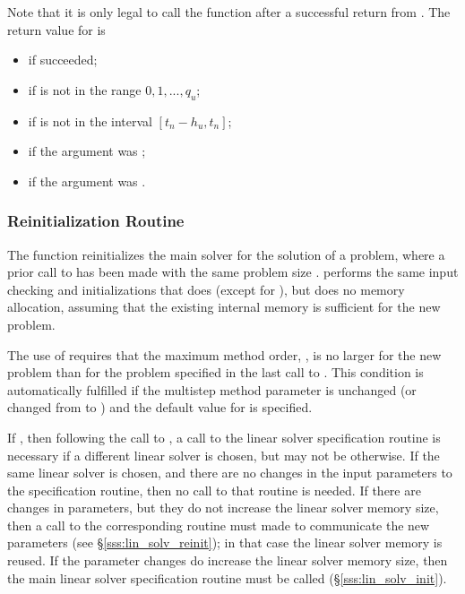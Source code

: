 Note that it is only legal to call the function  after a 
successful return from .
The return value  for  is
\begin{itemize}
\item {} if  succeeded;
\item {} if  is not in the range $0, 1, ..., q_u$;
\item {} if  is not in the interval $[t_n - h_u , t_n]$;
\item {} if the  argument was ;
\item {} if the  argument was .
\end{itemize}

\subsubsection{{\cvode} Reinitialization Routine}\label{sss:cvreinit}

The function  reinitializes the main {\cvode} solver for
the solution of a problem, where a prior call to  has
been made with the same problem size .  performs the 
same input checking and initializations that  does 
(except for ), but does no memory allocation, assuming that the 
existing internal memory is sufficient for the new problem.             
                                                                 
The use of  requires that the maximum method order,    
, is no larger for the new problem than for the problem  
specified in the last call to .  This condition is  
automatically fulfilled if the multistep method parameter   
is unchanged (or changed from  to ) and the default    
value for  is specified.                                 
                                                                 
If , then following the call to , a call  
to the linear solver specification routine is necessary if a   
different linear solver is chosen, but may not be otherwise.   
If the same linear solver is chosen, and there are no changes  
in the input parameters to the specification routine, then no  
call to that routine is needed.                                
If there are changes in parameters, but they do not increase   
the linear solver memory size, then a call to the corresponding
 routine must made to communicate the new      
parameters (see \S\ref{sss:lin_solv_reinit}); 
in that case the linear solver memory is reused.   
If the parameter changes do increase the linear solver memory  
size, then the main linear solver specification routine must be
called (\S\ref{sss:lin_solv_init}).

